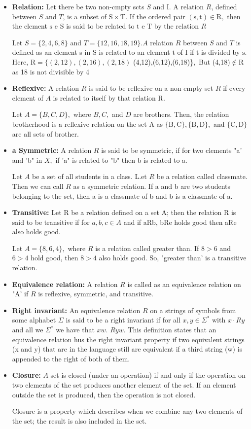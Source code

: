 \documentclass [10pt,a4paper]{book}
\begin{document}
\begin{itemize}

\item
\textbf{Relation:} Let there be two non-cmpty scts $S$ and I. A relation $R$, defined between $S$ and $T$, is a subset of $\mathrm{S} \times \mathrm{T}$. If the ordered pair $(\mathrm{s}, \mathrm{t}) \in \mathrm{R},$ then the element $\mathrm{s}$ e $\mathrm{S}$ is said to be related to $\mathrm{t}$ e $\mathrm{T}$ by the relation $R$

Let $S=\{2,4,6,8\}$ and $T=\{12,16,18,19\} . A$ relation $R$ between $S$ and $T$ is defined as an clement s in $\mathrm{S}$ is related to an element $\mathrm{t}$ of $\mathrm{I}$ if $\mathrm{t}$ is divided by $\mathrm{s}$. Here, $\mathrm{R}=\{(2,12),(2,16),(2,18)$ (4,12),(6,12),(6,18)\}$,$ But (4,18)$\notin \mathrm{R}$ as 18 is not divisible by 4
\item
\textbf{Reflexive:} A relation $R$ is said to be reflexive on a non-empty set $R$ if every element of $A$ is related to itself by that relation $\mathrm{R}$.

Let $A=\{B, C, D\},$ where $B, C,$ and $D$ are brothers. Then, the relation brotherhood is a reflexive relation on the set A as $\{\mathrm{B}, \mathrm{C}\},\{\mathrm{B}, \mathrm{D}\},$ and $\{\mathrm{C}, \mathrm{D}\}$ are all sets of brother.
\item
\textbf{a Symmetric:} A relation $R$ is said to be symmetric, if for two clements "a' and 'b" in $X,$ if 'a" is related to "b" then b is related to a.

Let $A$ be a set of all students in a class. L.et $R$ be a relation called classmate. Then we can call $R$ as a symmetric relation. If a and b are two students belonging to the set, then a is a classmate of b and b is a classmate of a.
\item
\textbf{Transitive:} Let R be a relation defined on a set A; then the relation $\mathrm{R}$ is said to be transitive if for $a, b, c \in A$ and if aRb, bRe holds good then aRe also holds good.

Let $A=\{8,6,4\},$ where $R$ is a relation called greater than. If $8>6$ and $6>4$ hold good, then $8>4$ also holds good. So, "greater than' is a transitive relation.
\item
\textbf{Equivalence relation:} A relation $R$ is called as an equivalence relation on "A' if $R$ is reflexive, symmetric, and transitive.
\item
\textbf{Right invariant:} An equivalence relation $R$ on a strings of symbols from some alphabet $\Sigma$ is said to be a right invariant if for all $x, y \in \Sigma^{*}$ with $x \cdot R y$ and all we $\Sigma^{*}$ we have that $x w$. $R y w$. This definition states that an equivalence relation hus the right invariant property if two equivalent strings (x and y) that are in the language still are equivalent if a third string (w) is appended to the right of both of them.
\item
\textbf{Closure:} $A$ set is closed (under an operation) if and only if the operation on two elements of the set produces another element of the set. If an element outside the set is produced, then the operation is not closed.

Closure is a property which describes when we combine any two elements of the set; the result is also included in the sct.
\end{itemize}
\end{document}
